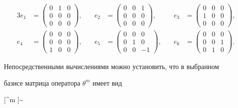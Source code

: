 \begin{alignat*}{3}


e_1&=\begin{pmatrix}


0 & 1 & 0 \\ 0 & 0 & 0 \\ 0 & 0 & 0


\end{pmatrix}, &\quad e_2&=\begin{pmatrix}


0 & 0 & 1 \\ 0 & 0 & 0 \\ 0 & 0 & 0


\end{pmatrix}, &\quad e_3&=\begin{pmatrix}


0 & 0 & 0 \\ 1 & 0 & 0 \\ 0 & 0 & 0


\end{pmatrix},\\


%


e_4&=\begin{pmatrix}


  0 & 0 & 0 \\  0 & 0 & 0 \\  1 & 0 & 0


\end{pmatrix}, &\quad e_5&=\begin{pmatrix}


  0 & 0 & 0 \\  0 & 1 & 0 \\  0 & 0 & -1


\end{pmatrix}, &\quad e_6&=\begin{pmatrix}


  0 & 0 & 0 \\  0 & 0 & 1 \\  0 & 1 & 0


\end{pmatrix}.


\end{alignat*}





Непосредственными вычислениями можно установить, что в выбранном


базисе матрица оператора $\theta ^m$ имеет вид


$$[\theta^m ]\sim


